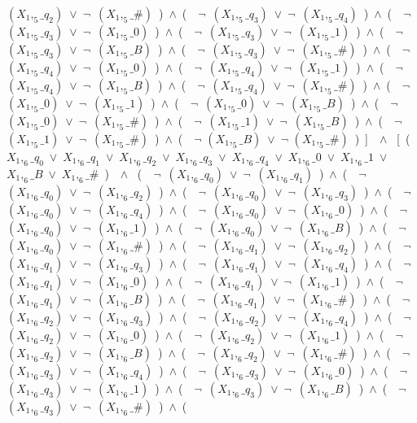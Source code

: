 ﻿\documentclass[a4paper,10pt]{article}
\begin{document}
$(X_1,_5\_q_2)$\ $\vee$\ $\neg$\ $(X_1,_5\_\#)$\ )\ $\wedge$\ (\ \ $\neg$\ $(X_1,_5\_q_3)$\ $\vee$\ $\neg$\ $(X_1,_5\_q_4)$\ )\ $\wedge$\ (\ \ $\neg$\ $(X_1,_5\_q_3)$\ $\vee$\ $\neg$\ $(X_1,_5\_0)$\ )\ $\wedge$\ (\ \ $\neg$\ $(X_1,_5\_q_3)$\ $\vee$\ $\neg$\ $(X_1,_5\_1)$\ )\ $\wedge$\ (\ \ $\neg$\ $(X_1,_5\_q_3)$\ $\vee$\ $\neg$\ $(X_1,_5\_B)$\ )\ $\wedge$\ (\ \ $\neg$\ $(X_1,_5\_q_3)$\ $\vee$\ $\neg$\ $(X_1,_5\_\#)$\ )\ $\wedge$\ (\ \ $\neg$\ $(X_1,_5\_q_4)$\ $\vee$\ $\neg$\ $(X_1,_5\_0)$\ )\ $\wedge$\ (\ \ $\neg$\ $(X_1,_5\_q_4)$\ $\vee$\ $\neg$\ $(X_1,_5\_1)$\ )\ $\wedge$\ (\ \ $\neg$\ $(X_1,_5\_q_4)$\ $\vee$\ $\neg$\ $(X_1,_5\_B)$\ )\ $\wedge$\ (\ \ $\neg$\ $(X_1,_5\_q_4)$\ $\vee$\ $\neg$\ $(X_1,_5\_\#)$\ )\ $\wedge$\ (\ \ $\neg$\ $(X_1,_5\_0)$\ $\vee$\ $\neg$\ $(X_1,_5\_1)$\ )\ $\wedge$\ (\ \ $\neg$\ $(X_1,_5\_0)$\ $\vee$\ $\neg$\ $(X_1,_5\_B)$\ )\ $\wedge$\ (\ \ $\neg$\ $(X_1,_5\_0)$\ $\vee$\ $\neg$\ $(X_1,_5\_\#)$\ )\ $\wedge$\ (\ \ $\neg$\ $(X_1,_5\_1)$\ $\vee$\ $\neg$\ $(X_1,_5\_B)$\ )\ $\wedge$\ (\ \ $\neg$\ $(X_1,_5\_1)$\ $\vee$\ $\neg$\ $(X_1,_5\_\#)$\ )\ $\wedge$\ (\ \ $\neg$ $(X_1,_5\_B)$\ $\vee$\ $\neg$ $(X_1,_5\_\#)$\ )\ ]\ \ $\wedge$ \ [\ (\ $X_1,_6\_q_0$\ $\vee$\ $X_1,_6\_q_1$\ $\vee$\ $X_1,_6\_q_2$\ $\vee$\ $X_1,_6\_q_3$\ $\vee$\ $X_1,_6\_q_4$\ $\vee$\ $X_1,_6\_0$\ $\vee$\ $X_1,_6\_1$\ $\vee$\ $X_1,_6\_B$\ $\vee$\ $X_1,_6\_\#$\ )\ \ $\wedge$ \ (\ \ $\neg$\ $(X_1,_6\_q_0)$\ $\vee$\ $\neg$\ $(X_1,_6\_q_1)$\ )\ $\wedge$\ (\ \ $\neg$\ $(X_1,_6\_q_0)$\ $\vee$\ $\neg$\ $(X_1,_6\_q_2)$\ )\ $\wedge$\ (\ \ $\neg$\ $(X_1,_6\_q_0)$\ $\vee$\ $\neg$\ $(X_1,_6\_q_3)$\ )\ $\wedge$\ (\ \ $\neg$\ $(X_1,_6\_q_0)$\ $\vee$\ $\neg$\ $(X_1,_6\_q_4)$\ )\ $\wedge$\ (\ \ $\neg$\ $(X_1,_6\_q_0)$\ $\vee$\ $\neg$\ $(X_1,_6\_0)$\ )\ $\wedge$\ (\ \ $\neg$\ $(X_1,_6\_q_0)$\ $\vee$\ $\neg$\ $(X_1,_6\_1)$\ )\ $\wedge$\ (\ \ $\neg$\ $(X_1,_6\_q_0)$\ $\vee$\ $\neg$\ $(X_1,_6\_B)$\ )\ $\wedge$\ (\ \ $\neg$\ $(X_1,_6\_q_0)$\ $\vee$\ $\neg$\ $(X_1,_6\_\#)$\ )\ $\wedge$\ (\ \ $\neg$\ $(X_1,_6\_q_1)$\ $\vee$\ $\neg$\ $(X_1,_6\_q_2)$\ )\ $\wedge$\ (\ \ $\neg$\ $(X_1,_6\_q_1)$\ $\vee$\ $\neg$\ $(X_1,_6\_q_3)$\ )\ $\wedge$\ (\ \ $\neg$\ $(X_1,_6\_q_1)$\ $\vee$\ $\neg$\ $(X_1,_6\_q_4)$\ )\ $\wedge$\ (\ \ $\neg$\ $(X_1,_6\_q_1)$\ $\vee$\ $\neg$\ $(X_1,_6\_0)$\ )\ $\wedge$\ (\ \ $\neg$\ $(X_1,_6\_q_1)$\ $\vee$\ $\neg$\ $(X_1,_6\_1)$\ )\ $\wedge$\ (\ \ $\neg$\ $(X_1,_6\_q_1)$\ $\vee$\ $\neg$\ $(X_1,_6\_B)$\ )\ $\wedge$\ (\ \ $\neg$\ $(X_1,_6\_q_1)$\ $\vee$\ $\neg$\ $(X_1,_6\_\#)$\ )\ $\wedge$\ (\ \ $\neg$\ $(X_1,_6\_q_2)$\ $\vee$\ $\neg$\ $(X_1,_6\_q_3)$\ )\ $\wedge$\ (\ \ $\neg$\ $(X_1,_6\_q_2)$\ $\vee$\ $\neg$\ $(X_1,_6\_q_4)$\ )\ $\wedge$\ (\ \ $\neg$\ $(X_1,_6\_q_2)$\ $\vee$\ $\neg$\ $(X_1,_6\_0)$\ )\ $\wedge$\ (\ \ $\neg$\ $(X_1,_6\_q_2)$\ $\vee$\ $\neg$\ $(X_1,_6\_1)$\ )\ $\wedge$\ (\ \ $\neg$\ $(X_1,_6\_q_2)$\ $\vee$\ $\neg$\ $(X_1,_6\_B)$\ )\ $\wedge$\ (\ \ $\neg$\ $(X_1,_6\_q_2)$\ $\vee$\ $\neg$\ $(X_1,_6\_\#)$\ )\ $\wedge$\ (\ \ $\neg$\ $(X_1,_6\_q_3)$\ $\vee$\ $\neg$\ $(X_1,_6\_q_4)$\ )\ $\wedge$\ (\ \ $\neg$\ $(X_1,_6\_q_3)$\ $\vee$\ $\neg$\ $(X_1,_6\_0)$\ )\ $\wedge$\ (\ \ $\neg$\ $(X_1,_6\_q_3)$\ $\vee$\ $\neg$\ $(X_1,_6\_1)$\ )\ $\wedge$\ (\ \ $\neg$\ $(X_1,_6\_q_3)$\ $\vee$\ $\neg$\ $(X_1,_6\_B)$\ )\ $\wedge$\ (\ \ $\neg$\ $(X_1,_6\_q_3)$\ $\vee$\ $\neg$\ $(X_1,_6\_\#)$\ )\ $\wedge$\ (\ 
\end{document}
